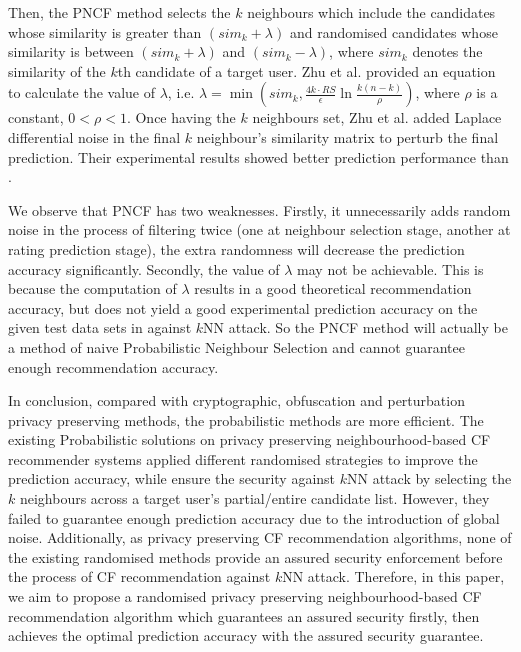 \documentclass[11pt]{article}
\begin{document}
Then, the PNCF method selects the $k$ neighbours which include the candidates whose similarity is greater than $(sim_k+\lambda)$ and randomised candidates whose similarity is between $(sim_k+\lambda)$ and $(sim_k-\lambda)$, where $sim_k$ denotes the similarity of the $k$th candidate of a target user. Zhu et al. \cite{ZHU2014} provided an equation to calculate the value of $\lambda$, i.e. $\lambda=\min(sim_k,\frac{4k\cdot RS}{\epsilon}\ln\frac{k(n-k)}{\rho})$, where $\rho$ is a constant, $0<\rho<1$. Once having the $k$ neighbours set, Zhu et al. \cite{ZHU2014} added Laplace differential noise in the final $k$ neighbour's similarity matrix to perturb the final prediction. Their experimental results showed better prediction performance than \cite{MCSHERRY2009}.

We observe that PNCF \cite{ZHU2014} has two weaknesses. Firstly, it unnecessarily adds random noise in the process of filtering twice (one at neighbour selection stage, another at rating prediction stage), the extra randomness will decrease the prediction accuracy significantly. Secondly, the value of $\lambda$ may not be achievable. This is because the computation of $\lambda$ results in a good theoretical recommendation accuracy, but does not yield a good experimental prediction accuracy on the given test data sets in \cite{ZHU2014} against $k$NN attack. So the PNCF method \cite{ZHU2014} will actually be a method of naive Probabilistic Neighbour Selection \cite{ADAMOPOULOS2014} and cannot guarantee enough recommendation accuracy.

In conclusion, compared with cryptographic, obfuscation and perturbation privacy preserving methods, the probabilistic methods are more efficient. The existing Probabilistic solutions \cite{MCSHERRY2009,ADAMOPOULOS2014,ZHU2014} on privacy preserving neighbourhood-based CF recommender systems applied different randomised strategies to improve the prediction accuracy, while ensure the security against $k$NN attack by selecting the $k$ neighbours across a target user's partial/entire candidate list. However, they failed to guarantee enough prediction accuracy due to the introduction of global noise. Additionally, as privacy preserving CF recommendation algorithms, none of the existing randomised methods provide an assured security enforcement before the process of CF recommendation against $k$NN attack. Therefore, in this paper, we aim to propose a randomised privacy preserving neighbourhood-based CF recommendation algorithm which guarantees an assured security firstly, then achieves the optimal prediction accuracy with the assured security guarantee.
\end{document}
